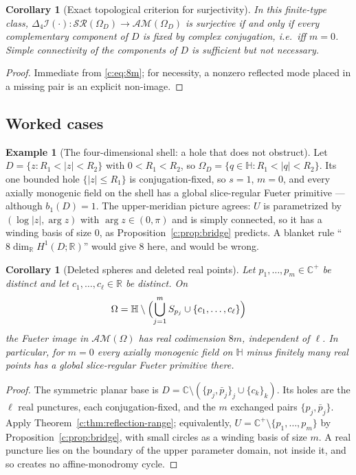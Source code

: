 \documentclass[11pt,a4paper]{article}
\numberwithin{equation}{section}
\newtheorem{corollary}[theorem]{Corollary}
\theoremstyle{definition}
\newtheorem{example}[theorem]{Example}
\theoremstyle{remark}
\theoremstyle{plain}
\newcommand{\HH}{\mathbb H}
\newcommand{\RR}{\mathbb R}
\newcommand{\CC}{\mathbb C}
\newcommand{\Cplus}{\CC^{+}}
\newcommand{\lap}{\Delta_4}
\newcommand{\I}{\mathcal I}
\newcommand{\SR}{\mathcal{SR}}
\newcommand{\AM}{\mathcal{AM}}
\newcommand{\Om}{\Omega}
\newcommand{\abs}[1]{\lvert #1\rvert}
\begin{document}
\begin{corollary}[Exact topological criterion for surjectivity]
\label{c:cor:onto}
In this finite-type class, $\lap\I(\cdot):\SR(\Om_D)\to\AM(\Om_D)$ is
surjective if and only if every complementary component of $D$ is fixed
by complex conjugation, i.e.\ iff $m=0$.  Simple connectivity of the
components of $D$ is sufficient but not necessary.
\end{corollary}

\begin{proof}
Immediate from \eqref{c:eq:8m}; for necessity, a nonzero reflected mode
placed in a missing pair is an explicit non-image.
\end{proof}

\subsection{Worked cases}

\begin{example}[The four-dimensional shell: a hole that does not obstruct]
\label{c:ex:shell}
Let $D=\{z:R_1<\abs z<R_2\}$ with $0<R_1<R_2$, so
$\Om_D=\{q\in\HH:R_1<\abs q<R_2\}$.  Its one bounded hole
$\{\abs z\le R_1\}$ is conjugation-fixed, so $s=1$, $m=0$, and every
axially monogenic field on the shell has a global slice-regular Fueter
primitive — although $b_1(D)=1$.  The upper-meridian picture agrees:
$U$ is parametrized by $(\log\abs z,\arg z)$ with $\arg z\in(0,\pi)$ and
is simply connected, so it has a winding basis of size $0$, as
Proposition~\ref{c:prop:bridge} predicts.  A blanket rule
``$8\dim_\RR H^1(D;\RR)$'' would give $8$ here, and would be wrong.
\end{example}

\begin{corollary}[Deleted spheres and deleted real points]
\label{c:cor:deleted}
Let $p_1,\dots,p_m\in\Cplus$ be distinct and let $c_1,\dots,c_\ell\in\RR$
be distinct.  On
\[
  \Om=\HH\setminus\Bigl(\bigcup_{j=1}^{m}S_{p_j}\cup
     \{c_1,\dots,c_\ell\}\Bigr)
\]
the Fueter image in $\AM(\Om)$ has real codimension $8m$, independent of
$\ell$.  In particular, for $m=0$ every axially monogenic field on
$\HH$ minus finitely many real points has a global slice-regular Fueter
primitive there.
\end{corollary}

\begin{proof}
The symmetric planar base is
$D=\CC\setminus(\{p_j,\bar p_j\}_j\cup\{c_k\}_k)$.  Its holes are the
$\ell$ real punctures, each conjugation-fixed, and the $m$ exchanged
pairs $\{p_j,\bar p_j\}$.  Apply Theorem~\ref{c:thm:reflection-range};
equivalently, $U=\Cplus\setminus\{p_1,\dots,p_m\}$ by
Proposition~\ref{c:prop:bridge}, with small circles as a winding basis of
size $m$.  A real puncture lies on the boundary of the upper parameter
domain, not inside it, and so creates no affine-monodromy cycle.
\end{proof}
\end{document}
